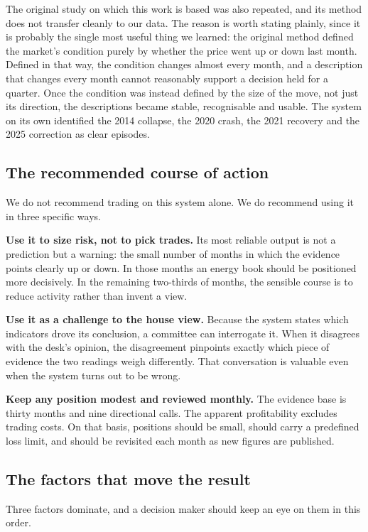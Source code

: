 \documentclass[11pt,a4paper]{article}
\begin{document}
The original study on which this work is based was also repeated, and its method does not transfer
cleanly to our data. The reason is worth stating plainly, since it is probably the single most
useful thing we learned: the original method defined the market's condition purely by whether
the price went up or down last month. Defined in that way, the condition changes almost every
month, and a description that changes every month cannot reasonably support a decision held for
a quarter. Once the condition was instead defined by the size of the move, not just its
direction, the descriptions became stable, recognisable and usable. The system on its own
identified the 2014 collapse, the 2020 crash, the 2021 recovery and the 2025 correction as
clear episodes.

\subsection{The recommended course of action}

We do not recommend trading on this system alone. We do recommend using it in three specific ways.

\textbf{Use it to size risk, not to pick trades.} Its most reliable output is not a prediction
but a warning: the small number of months in which the evidence points clearly up or down.
In those months an energy book should be positioned more decisively. In the remaining two-thirds of
months, the sensible course is to reduce activity rather than invent a view.

\textbf{Use it as a challenge to the house view.} Because the system states which indicators drove
its conclusion, a committee can interrogate it. When it disagrees with the desk's opinion,
the disagreement pinpoints exactly which piece of evidence the two readings weigh differently.
That conversation is valuable even when the system turns out to be wrong.

\textbf{Keep any position modest and reviewed monthly.} The evidence base is thirty months and nine
directional calls. The apparent profitability excludes trading costs. On that basis, positions should
be small, should carry a predefined loss limit, and should be revisited each month as new figures
are published.

\subsection{The factors that move the result}

Three factors dominate, and a decision maker should keep an eye on them in this order.
\end{document}
